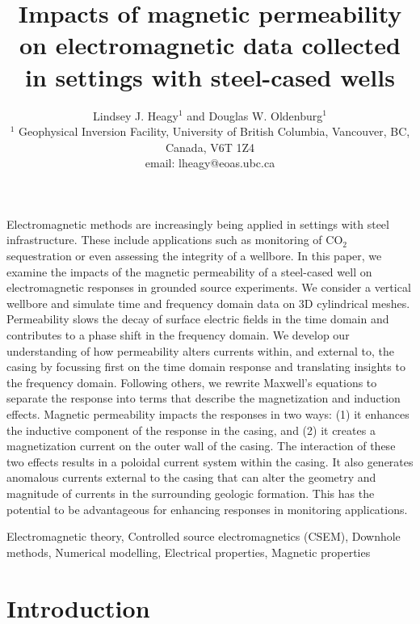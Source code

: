 \documentclass[onecolumn, extra, mreferee]{gji}
\title[EM with conductive, permeable wells]{
  Impacts of magnetic permeability on electromagnetic data collected in settings with steel-cased wells
}
\author[L. J. Heagy and D. W. Oldenburg]{
  Lindsey J. Heagy$^1$ and Douglas W. Oldenburg$^1$\\
  $^1$ Geophysical Inversion Facility, University of British Columbia, Vancouver, BC, Canada, V6T 1Z4
  \\ \quad email: lheagy@eoas.ubc.ca
}
\begin{document}
\label{firstpage}

\maketitle

\begin{summary}
Electromagnetic methods are increasingly being applied in settings with steel infrastructure. These include applications such as monitoring of CO$_2$ sequestration or even assessing the integrity of a wellbore. In this paper, we examine the impacts of the magnetic permeability of a steel-cased well on electromagnetic responses in grounded source experiments. We consider a vertical wellbore and simulate time and frequency domain data on 3D cylindrical meshes. Permeability slows the decay of surface electric fields in the time domain and contributes to a phase shift in the frequency domain. We develop our understanding of how permeability alters currents within, and external to, the casing by focussing first on the time domain response and translating insights to the frequency domain. Following others, we rewrite Maxwell's equations to separate the response into terms that describe the magnetization and induction effects. Magnetic permeability impacts the responses in two ways: (1) it enhances the inductive component of the response in the casing, and (2) it creates a magnetization current on the outer wall of the casing. The interaction of these two effects results in a poloidal current system within the casing. It also generates anomalous currents external to the casing that can alter the geometry and magnitude of currents in the surrounding geologic formation. This has the potential to be advantageous for enhancing responses in monitoring applications.
\end{summary}

\begin{keywords}
Electromagnetic theory, Controlled source electromagnetics (CSEM), Downhole methods, Numerical modelling, Electrical properties, Magnetic properties
\end{keywords}


\section{Introduction}
\end{document}
